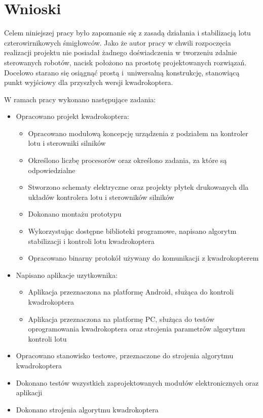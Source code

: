 
\chapter{Wnioski} %

\label{Chapter8} %


Celem niniejszej pracy było zapoznanie się z zasadą działania i stabilizacją lotu czterowirnikowych śmigłowców. Jako że autor pracy w chwili rozpoczęcia realizacji projektu nie posiadał żadnego doświadczenia w tworzeniu zdalnie sterowanych robotów, nacisk położono na prostotę projektowanych rozwiązań. Docelowo starano się osiągnąć prostą i~uniwersalną konstrukcję, stanowiącą punkt wyjściowy dla przyszłych wersji kwadrokoptera.

W ramach pracy wykonano następujące zadania:
\begin{itemize}
	\item Opracowano projekt kwadrokoptera:
	\begin{itemize}
		\item Opracowano modułową koncepcję urządzenia z podziałem na kontroler lotu i sterowniki silników
		\item Określono liczbę procesorów oraz określono zadania, za które są odpowiedzialne
		\item Stworzono schematy elektryczne oraz projekty płytek drukowanych dla układów kontrolera lotu i sterowników silników
		\item Dokonano montażu prototypu
		\item Wykorzystując dostępne biblioteki programowe, napisano algorytm stabilizacji i kontroli lotu kwadrokoptera
		\item Opracowano binarny protokół używany do komunikacji z kwadrokopterem
	\end{itemize}
	\item Napisano aplikacje uzytkownika:
	\begin{itemize}
		\item Aplikacja przeznaczona na platformę Android, służąca do kontroli kwadrokoptera
		\item Aplikacja przeznaczona na platformę PC, służąca do testów oprogramowania kwadrokoptera oraz strojenia parametrów algorytmu kontroli lotu
	\end{itemize}
	\item Opracowano stanowisko testowe, przeznaczone do strojenia algorytmu kwadrokoptera	
	\item Dokonano testów wszystkich zaprojektowanych modułów elektronicznych oraz aplikacji
	\item Dokonano strojenia algorytmu kwadrokoptera
\end{itemize}

